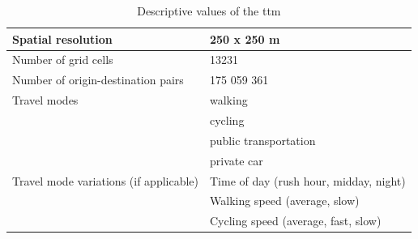 \begin{table}[H]
	\caption{Descriptive values of the \acrshort{ttm} \parencite{fin2023}}
	\label{tab:ttm indicators}
	\centering
	\begin{tabular}{ | L{0.4\textwidth} | L{0.5\textwidth} | }
		\hline
		Spatial resolution
		& 250 x 250 m
		\\
		\hline
		Number of grid cells
		& 13231
		\\
		\hline
		Number of origin-destination pairs
		& 175 059 361
		\\
		\hline
		Travel modes
		& \tabitem walking \\
		& \tabitem cycling \\
		& \tabitem public transportation \\
		& \tabitem private car \\
		\hline
		Travel mode variations (if applicable)
		& \tabitem Time of day (rush hour, midday, night) \\
		& \tabitem Walking speed (average, slow) \\
		& \tabitem Cycling speed (average, fast, slow) \\
		\hline
	\end{tabular}
\end{table}

